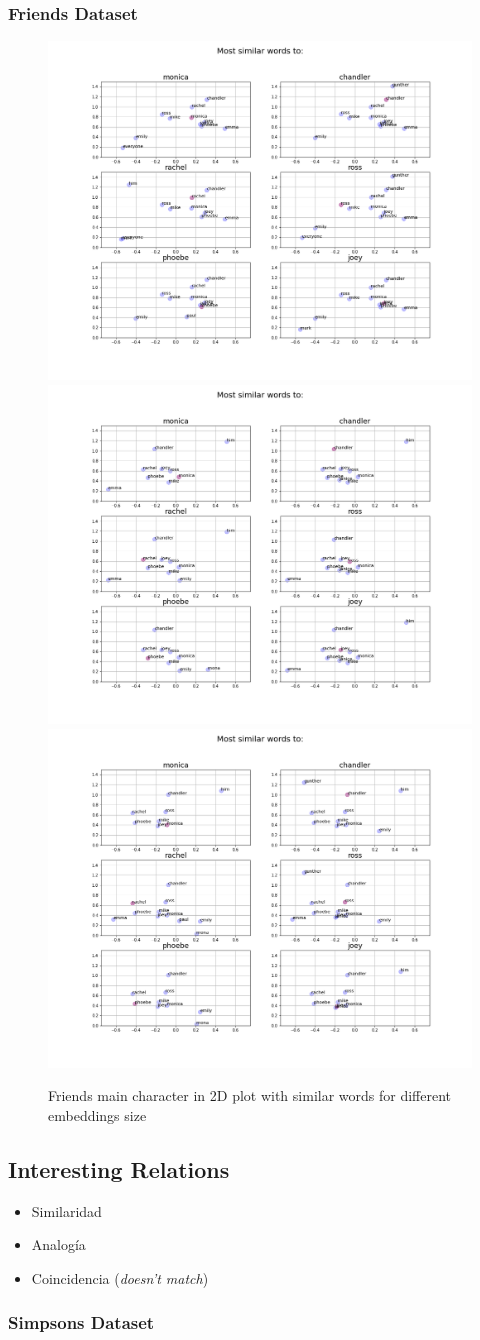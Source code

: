 \subsubsection{Friends Dataset}

\begin{figure}[H]

\centering
\includegraphics[width=.3\textwidth]{results/embeddings/friends_similar_15.png}\hfill
\includegraphics[width=.3\textwidth]{results/embeddings/friends_similar_75.png}\hfill
\includegraphics[width=.3\textwidth]{results/embeddings/friends_similar_150.png}
\caption{Friends main character in 2D plot with similar words for different embeddings size}
\label{fig:friends_sim_words}

\end{figure}

\subsection{Interesting Relations}
\begin{itemize}
    \item Similaridad
    
    \item Analogía 
    
    \item Coincidencia (\textit{doesn't match})
\end{itemize}

\subsubsection{Simpsons Dataset}

